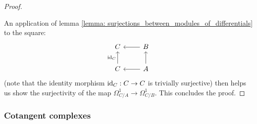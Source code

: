 \begin{proof}
\begin{itemize}
                        \end{itemize}
                    An application of lemma \ref{lemma: surjections_between_modules_of_differentials} to the square:
                        $$
                            \begin{tikzcd}
                            	C & B \\
                            	C & A
                            	\arrow["{\id_C}", from=2-1, to=1-1]
                            	\arrow[from=2-2, to=1-2]
                            	\arrow[from=1-2, to=1-1]
                            	\arrow[from=2-2, to=2-1]
                            \end{tikzcd}
                        $$
                    (note that the identity morphism $\mathrm{id}_C: C \to C$ is trivially surjective) then helps us show the surjectivity of the map $\Omega^1_{C/A} \to \Omega^1_{C/B}$. This concludes the proof.
                \end{proof}
                
        \subsubsection{Cotangent complexes}

